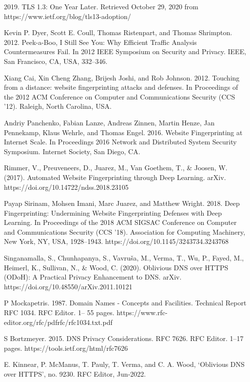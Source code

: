 \begin{thebibliography}{1}
2019. TLS 1.3: One Year Later. Retrieved October 29, 2020 from https://www.ietf.org/blog/tls13-adoption/

Kevin P. Dyer, Scott E. Coull, Thomas Ristenpart, and Thomas Shrimpton. 2012.
Peek-a-Boo, I Still See You: Why Efficient Traffic Analysis Countermeasures Fail.
In 2012 IEEE Symposium on Security and Privacy. IEEE, San Francisco, CA, USA,
332–346.

Xiang Cai, Xin Cheng Zhang, Brijesh Joshi, and Rob Johnson. 2012. Touching
from a distance: website fingerprinting attacks and defenses. In Proceedings of
the 2012 ACM Conference on Computer and Communications Security (CCS ’12).
Raleigh, North Carolina, USA.

Andriy Panchenko, Fabian Lanze, Andreas Zinnen, Martin Henze, Jan Pennekamp,
Klaus Wehrle, and Thomas Engel. 2016. Website Fingerprinting at Internet Scale.
In Proceedings 2016 Network and Distributed System Security Symposium. Internet
Society, San Diego, CA.

Rimmer, V., Preuveneers, D., Juarez, M., Van Goethem, T., \& Joosen, W. (2017). Automated Website Fingerprinting through Deep Learning. arXiv. https://doi.org/10.14722/ndss.2018.23105

Payap Sirinam, Mohsen Imani, Marc Juarez, and Matthew Wright. 2018. Deep Fingerprinting: Undermining Website Fingerprinting Defenses with Deep Learning. In Proceedings of the 2018 ACM SIGSAC Conference on Computer and Communications Security (CCS '18). Association for Computing Machinery, New York, NY, USA, 1928–1943. https://doi.org/10.1145/3243734.3243768

{Singanamalla, S., Chunhapanya, S., Vavruša, M., Verma, T., Wu, P., Fayed, M., Heimerl, K., Sullivan, N., \& Wood, C. (2020). Oblivious DNS over HTTPS (ODoH): A Practical Privacy Enhancement to DNS. arXiv. https://doi.org/10.48550/arXiv.2011.10121}


 P Mockapetris. 1987. Domain Names - Concepts and Facilities. Technical Report RFC 1034. RFC Editor. 1– 55 pages. https://www.rfc-editor.org/rfc/pdfrfc/rfc1034.txt.pdf

S Bortzmeyer. 2015. DNS Privacy Considerations. RFC 7626. RFC Editor. 1–17 pages. https://tools.ietf.org/html/rfc7626


 E. Kinnear, P. McManus, T. Pauly, T. Verma, and C. A. Wood, ‘Oblivious DNS over HTTPS’, no. 9230. RFC Editor, Jun-2022.



\end{thebibliography}
